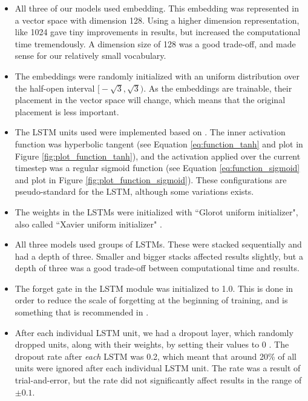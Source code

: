 \begin{itemize}
    \item All three of our models used embedding. This embedding was represented in a vector space with dimension 128. Using a higher dimension representation, like 1024 gave tiny improvements in results, but increased the computational time tremendously. A dimension size of 128 was a good trade-off, and made sense for our relatively small vocabulary.
    \item The embeddings were randomly initialized with an uniform distribution over the half-open interval \(\big[-\sqrt{3}, \sqrt{3}\big)\). As the embeddings are trainable, their placement in the vector space will change, which means that the original placement is less important.
    \item The LSTM units used were implemented based on \citep{hochreiter1997long}. The inner activation function was hyperbolic tangent (see Equation \ref{eq:function_tanh} and plot in Figure \ref{fig:plot_function_tanh}), and the activation applied over the current timestep was a regular sigmoid function (see Equation \ref{eq:function_sigmoid} and plot in Figure \ref{fig:plot_function_sigmoid}). These configurations are pseudo-standard for the LSTM, although some variations exists.
    \item The weights in the LSTMs were initialized with ``Glorot uniform initializer", also called ``Xavier uniform initializer" \citep{glorot2010understanding}.
    \item All three models used groups of LSTMs. These were stacked sequentially and had a depth of three. Smaller and bigger stacks affected results slightly, but a depth of three was a good trade-off between computational time and results.
    \item The forget gate in the LSTM module was initialized to 1.0. This is done in order to reduce the scale of forgetting at the beginning of training, and is something that is recommended in \citep{zaremba2015empirical}.
    \item After each individual LSTM unit, we had a dropout layer, which randomly dropped units, along with their weights, by setting their values to 0 \citep{srivastava2014dropout}. The dropout rate after \emph{each} LSTM was 0.2, which meant that around 20\% of all units were ignored after each individual LSTM unit. The rate was a result of trial-and-error, but the rate did not significantly affect results in the range of \(\pm 0.1\).
\end{itemize}

